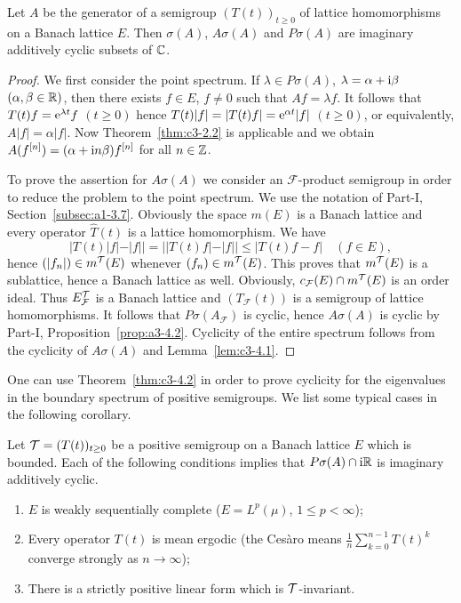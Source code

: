 \begin{theorem}\label{thm:c3-4.2}
	Let $A$ be the generator of a semigroup $(T(t))_{t \geq 0}$ of lattice homomorphisms on a Banach lattice $E$. 
	Then $\sigma(A)$, $A\sigma(A)$ and $P\sigma(A)$ are imaginary additively cyclic subsets of\/ $\mathbb{C} $.
\end{theorem}
\begin{proof}
	We first consider the point spectrum. 
	If\/ $\lambda \in P\sigma(A)$, $\lambda = \alpha + \mathrm{i}\beta$ $(\alpha,\beta \in \mathbb{R} )$, then there exists $f \in E$, $f \neq 0$ such that $Af = \lambda f$. 
	It follows that $T(t)f = \mathrm{e}^{\lambda t}f$ $(t \geq 0)$ hence $T(t)|f| = |T(t)f| = \mathrm{e}^{\alpha t}|f|$ $(t \geq 0)$, or equivalently, $A|f| = \alpha|f|$. 
	Now Theorem~\ref{thm:c3-2.2} is applicable and we obtain $A(f^{[n]}) = (\alpha + \mathrm{i} n\beta)f^{[n]}$ for all $n \in \mathbb{Z}$.
	
	To prove the assertion for $A\sigma(A)$ we consider an $\mathcal{F}$-product semigroup%
    in order to reduce the problem to the point spectrum. 
	We use the notation of Part-I, Section~\ref{subsec:a1-3.7}. 
	Obviously the space $m(E)$ is a Banach lattice and every operator $\hat{T}(t)$ is a lattice homomorphism. 
	We have %
\[
	|T(t)|f| - |f|| = ||T(t)f| - |f|| \leq |T(t)f - f| \quad (f \in E) ,
\]
%
hence $(|f_{n}|) \in m^{\mathcal{T}}(E)$ whenever $(f_{n}) \in m^{\mathcal{T}}(E)$. 
	This proves that $m^{\mathcal{T}}(E)$ is a sublattice, hence a Banach lattice as well. 
	Obviously, $c_{\mathcal{F}}(E)\cap m^{\mathcal{T}}(E)$ is an order ideal. 
	Thus $E_{\mathcal{F}}^{\mathcal{T}}$ is a Banach lattice and $(T_{\mathcal{F}}(t))$ is a semigroup of lattice homomorphisms. 
	It follows that $P\sigma(A_{\mathcal{F}})$ is cyclic, hence $A\sigma(A)$ is cyclic by Part-I, Proposition~\ref{prop:a3-4.2}.
Cyclicity of the entire spectrum follows from the cyclicity of\/ $A\sigma(A)$ and Lemma~\ref{lem:c3-4.1}.
\end{proof}
One can use Theorem~\ref{thm:c3-4.2} in order to prove cyclicity for the eigenvalues in the boundary spectrum of positive semigroups. 
We list some typical cases in the following corollary.
\begin{corollary}\label{cor:c3-4.3}
	Let $\TT = (T(t))_{t \geq 0}$ be a positive semigroup on a Banach lattice $E$ which is bounded. 
	Each of the following conditions implies that $P\sigma(A)\cap \mathrm{i}\mathbb{R} $ is imaginary additively cyclic.
	\begin{enumerate}[\upshape (i)]
		\item $E$ is weakly sequentially complete (\eg $E = L^{p}(\mu)$, $1 \leq p < \infty$);
		\item Every operator $T(t)$ is mean ergodic (\ie the Cesàro means $\frac{1}{n}\sum_{k=0}^{n-1}T(t)^{k}$ converge strongly as $n \to  \infty$);
		\item There is a strictly positive linear form which is $\mathcal{T}$-invariant.
	\end{enumerate}
\end{corollary}
